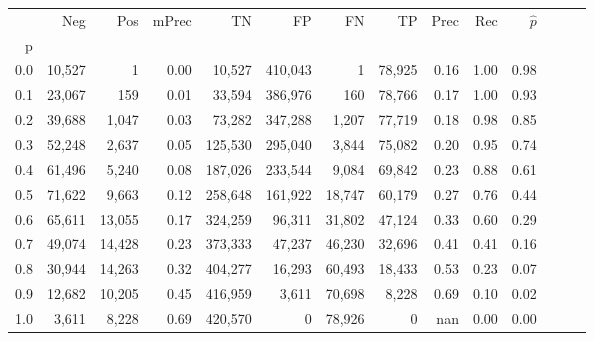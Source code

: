 \begin{tabular}{rrrrrrrrrrrrrr}
\toprule
{} &     Neg &     Pos & mPrec &       TN &       FP &      FN &      TP &  Prec &   Rec & $\hat{p}$ \\
p   &         &         &       &          &          &         &         &       &       &           \\
\midrule
0.0 &  10,527 &       1 &  0.00 &   10,527 &  410,043 &       1 &  78,925 &  0.16 &  1.00 &      0.98 \\
0.1 &  23,067 &     159 &  0.01 &   33,594 &  386,976 &     160 &  78,766 &  0.17 &  1.00 &      0.93 \\
0.2 &  39,688 &   1,047 &  0.03 &   73,282 &  347,288 &   1,207 &  77,719 &  0.18 &  0.98 &      0.85 \\
0.3 &  52,248 &   2,637 &  0.05 &  125,530 &  295,040 &   3,844 &  75,082 &  0.20 &  0.95 &      0.74 \\
0.4 &  61,496 &   5,240 &  0.08 &  187,026 &  233,544 &   9,084 &  69,842 &  0.23 &  0.88 &      0.61 \\
0.5 &  71,622 &   9,663 &  0.12 &  258,648 &  161,922 &  18,747 &  60,179 &  0.27 &  0.76 &      0.44 \\
0.6 &  65,611 &  13,055 &  0.17 &  324,259 &   96,311 &  31,802 &  47,124 &  0.33 &  0.60 &      0.29 \\
0.7 &  49,074 &  14,428 &  0.23 &  373,333 &   47,237 &  46,230 &  32,696 &  0.41 &  0.41 &      0.16 \\
0.8 &  30,944 &  14,263 &  0.32 &  404,277 &   16,293 &  60,493 &  18,433 &  0.53 &  0.23 &      0.07 \\
0.9 &  12,682 &  10,205 &  0.45 &  416,959 &    3,611 &  70,698 &   8,228 &  0.69 &  0.10 &      0.02 \\
1.0 &   3,611 &   8,228 &  0.69 &  420,570 &        0 &  78,926 &       0 &   nan &  0.00 &      0.00 \\
\bottomrule
\end{tabular}
